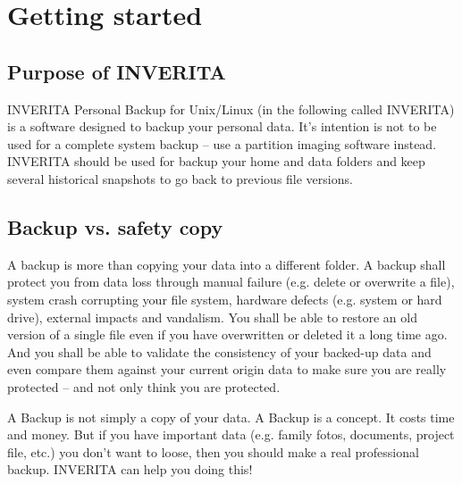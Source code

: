 %
%
%
%


\chapter{Getting started}

\section{Purpose of INVERITA}
INVERITA Personal Backup for Unix/Linux (in the following called INVERITA)
is a software designed to backup your personal data. It's intention is not to be
used for a complete system backup -- use a partition imaging software instead.
INVERITA should be used for backup your home and data folders and keep several
historical snapshots to go back to previous file versions.

\section{Backup vs. safety copy}
A backup is more than copying your data into a different folder. A backup shall
protect you from data loss through manual failure (e.g. delete or overwrite a file),
system crash corrupting your file system, hardware defects (e.g. system or
hard drive), external impacts and vandalism. You shall be able to restore an old
version of a single file even if you have overwritten or deleted it a long time ago.
And you shall be able to validate the consistency of your backed-up data and even
compare them against your current origin data to make sure you are really
protected -- and not only think you are protected.

A Backup is not simply a copy of your data. A Backup is a concept. It costs time
and money. But if you have important data (e.g. family fotos, documents, project file, etc.)
you don't want to loose, then you should make a real professional backup.
INVERITA can help you doing this!

